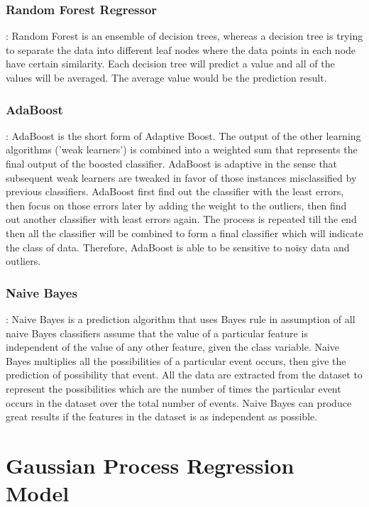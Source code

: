 \documentclass{article}
\begin{document}
	\subsubsection{Random Forest Regressor}: 
	Random Forest is an ensemble of decision trees, whereas a decision tree is trying to separate the data into different
	leaf nodes where the data points in each node have certain similarity. Each decision tree will predict a value and all of the values 
	will be averaged. The average value would be the prediction result.

	\subsubsection{AdaBoost}: 
	AdaBoost is the short form of Adaptive Boost. The output of the other learning algorithms ('weak learners') is combined 
	into a weighted sum that represents the final output of the boosted classifier. AdaBoost is adaptive in the sense that subsequent weak 
	learners are tweaked in favor of those instances misclassified by previous classifiers. AdaBoost first find out the classifier with the least errors, 
	then focus on those errors later by adding the weight to the outliers, then find out another classifier with least errors again. 
	The process is repeated till the end then all the classifier will be combined to form a final classifier which will indicate the class of data. 
	Therefore, AdaBoost is able to be sensitive to noisy data and outliers.

	\subsubsection{Naive Bayes}: 
	Naive Bayes is a prediction algorithm that uses Bayes rule in assumption of all naive Bayes classifiers assume that the value of a particular feature is 
	independent of the value of any other feature, given the class variable. Naive Bayes multiplies all the possibilities of a particular event occurs, then 
	give the prediction of possibility that event. All the data are extracted from the dataset to represent the possibilities which are the number of times 
	the particular event occurs in the dataset over the total number of events. Naive Bayes can produce great results if the features in the dataset is as 
	independent as possible. 
	
	\section{Gaussian Process Regression Model}
\end{document}
